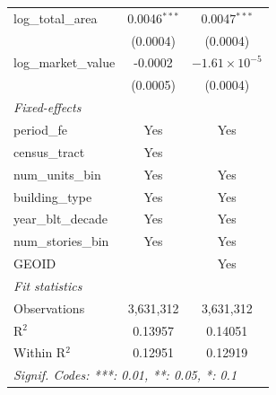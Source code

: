 \begin{tabular}{lcc}
   log\_total\_area                                      & 0.0046$^{***}$          & 0.0047$^{***}$\\   
                                                         & (0.0004)                & (0.0004)\\   
   log\_market\_value                                    & -0.0002                 & $-1.61\times 10^{-5}$\\    
                                                         & (0.0005)                & (0.0004)\\   
   \midrule
   \emph{Fixed-effects}\\
   period\_fe                                            & Yes                     & Yes\\  
   census\_tract                                         & Yes                     & \\  
   num\_units\_bin                                       & Yes                     & Yes\\  
   building\_type                                        & Yes                     & Yes\\  
   year\_blt\_decade                                     & Yes                     & Yes\\  
   num\_stories\_bin                                     & Yes                     & Yes\\  
   GEOID                                                 &                         & Yes\\  
   \midrule
   \emph{Fit statistics}\\
   Observations                                          & 3,631,312               & 3,631,312\\  
   R$^2$                                                 & 0.13957                 & 0.14051\\  
   Within R$^2$                                          & 0.12951                 & 0.12919\\  
   \midrule \midrule
   \multicolumn{3}{l}{\emph{Signif. Codes: ***: 0.01, **: 0.05, *: 0.1}}\\
\end{tabular}
\par\endgroup
\begingroup
\centering
